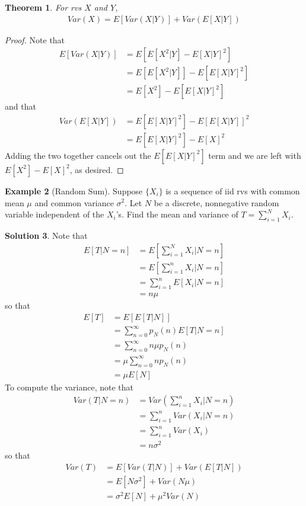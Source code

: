\documentclass[11pt]{amsart}
\newtheorem{theorem}{Theorem}[section]
\theoremstyle{definition}
\newtheorem{example}[theorem]{Example}
\newtheorem{solution}[theorem]{Solution}
\numberwithin{equation}{section}
\begin{document}
 \begin{theorem}
     For rvs $X$ and $Y$,
     \begin{align*}
         Var(X)=E[Var(X|Y)]+Var(E[X|Y])
     \end{align*}
 \end{theorem}
 \begin{proof}
    Note that 
    \begin{align*}
        E[Var(X|Y)]&=E[E[X^2|Y]-E[X|Y]^2]\\
        &=E[E[X^2|Y]]-E[E[X|Y]^2]\\
        &=E[X^2]-E[E[X|Y]^2]
    \end{align*}
    and that
    \begin{align*}
        Var(E[X|Y])&=E[E[X|Y]^2]-E[E[X|Y]]^2\\
        &=E[E[X|Y]^2]-E[X]^2
    \end{align*}
    Adding the two together cancels out the $E[E[X|Y]^2]$ term and we are left with $E[X^2]-E[X]^2$, as desired.
 \end{proof}
 \begin{example}[Random Sum]\label{randomsum}
     Suppose $\{X_i\}$ is a sequence of iid rvs with common mean $\mu$ and common variance $\sigma^2$. Let $N$ be a discrete, nonnegative random variable independent of the $X_i$'s. Find the mean and variance of $T=\sum_{i=1}^NX_i$.
 \end{example}
 \addtocounter{theorem}{-1}
 \begin{solution}
     Note that
     \begin{align*}
         E[T|N=n]&=E[\sum_{i=1}^NX_i|N=n]\\
         &=E[\sum_{i=1}^nX_i|N=n]\\
         &=\sum_{i=1}^nE[X_i|N=n]\\
         &=n\mu
     \end{align*}
     so that 
     \begin{align*}
         E[T]&=E[E[T|N]]\\
         &=\sum_{n=0}^\infty p_N(n)E[T|N=n]\\
         &=\sum_{n=0}^\infty n\mu p_N(n)\\
         &=\mu\sum_{n=0}^\infty np_N(n)\\
         &=\mu E[N]
     \end{align*}
     To compute the variance, note that
     \begin{align*}
         Var(T|N=n)&=Var(\sum_{i=1}^nX_i|N=n)\\
         &=\sum_{i=1}^nVar(X_i|N=n)\\
         &=\sum_{i=1}^nVar(X_i)\\
         &=n\sigma^2
     \end{align*}
     so that
     \begin{align*}
         Var(T)&=E[Var(T|N)]+Var(E[T|N])\\
         &=E[N\sigma^2]+Var(N\mu)\\
         &=\sigma^2E[N]+\mu^2Var(N)
     \end{align*}
 \end{solution}
\end{document}
